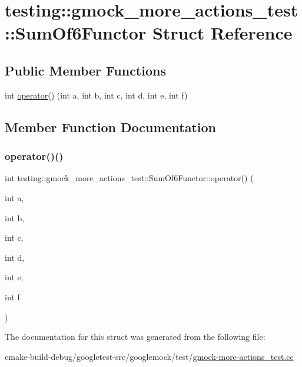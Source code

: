 \hypertarget{structtesting_1_1gmock__more__actions__test_1_1SumOf6Functor}{}\section{testing\+::gmock\+\_\+more\+\_\+actions\+\_\+test\+::Sum\+Of6\+Functor Struct Reference}
\label{structtesting_1_1gmock__more__actions__test_1_1SumOf6Functor}
\subsection*{Public Member Functions}
\begin{DoxyCompactItemize}
\item 
int \mbox{\hyperlink{structtesting_1_1gmock__more__actions__test_1_1SumOf6Functor_adc0cc4dbd423db7298497b8a9630067e}{operator()}} (int a, int b, int c, int d, int e, int f)
\end{DoxyCompactItemize}


\subsection{Member Function Documentation}
\mbox{\label{structtesting_1_1gmock__more__actions__test_1_1SumOf6Functor_adc0cc4dbd423db7298497b8a9630067e}} 
\subsubsection{\texorpdfstring{operator()()}{operator()()}}
{\footnotesize\ttfamily int testing\+::gmock\+\_\+more\+\_\+actions\+\_\+test\+::\+Sum\+Of6\+Functor\+::operator() (\begin{DoxyParamCaption}\item[{int}]{a,  }\item[{int}]{b,  }\item[{int}]{c,  }\item[{int}]{d,  }\item[{int}]{e,  }\item[{int}]{f }\end{DoxyParamCaption})\hspace{0.3cm}{\ttfamily [inline]}}



The documentation for this struct was generated from the following file\+:\begin{DoxyCompactItemize}
\item 
cmake-\/build-\/debug/googletest-\/src/googlemock/test/\mbox{\hyperlink{gmock-more-actions__test_8cc}{gmock-\/more-\/actions\+\_\+test.\+cc}}\end{DoxyCompactItemize}
